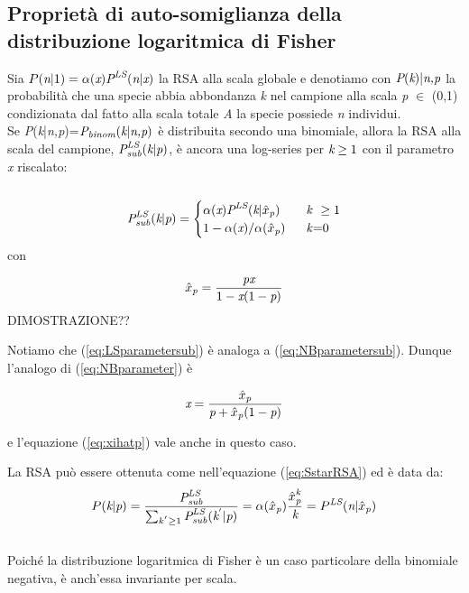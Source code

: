 \subsection{Proprietà di auto-somiglianza della distribuzione logaritmica di Fisher}
Sia $P(\emph{n}|1)=\alpha(\emph{x})\emph{P}^{\emph{LS}}(\emph{n}|\emph{x})$ la RSA alla scala globale e denotiamo con $\emph{P}(\emph{k})|\emph{n,p}$ la probabilità che una specie abbia abbondanza \emph{k} nel campione alla scala \emph{p} $\in$ (0,1) condizionata dal fatto  alla scala totale \emph{A} la specie possiede \emph{n} individui.\\
Se \emph{P}(\emph{k}|\emph{n,p})=$\emph{P}_\emph{binom}(\emph{k}|\emph{n,p})$ è distribuita secondo una binomiale, allora la RSA alla scala del campione, $\emph{P}^\emph{LS}_\emph{sub}(\emph{k}|\emph{p})$, è ancora una log-series per $\emph{k}\ge 1$ con il parametro \emph{x} riscalato:
\\ \\
\begin{equation}
\emph{P}^\emph{LS}_\emph{sub}(\emph{k}|\emph{p})=\begin{cases} \alpha(\emph{x}) \emph{P}^\emph{LS}(\emph{k}|\emph{$ \hat x$}_\emph{p}) & \mbox{ }\mbox{ \emph{k} } \ge 1 \\ 1-\alpha(\emph{x})/\alpha(\emph{$\hat x$}_\emph{p}) & \mbox{ } \mbox{ \emph{k}=0}
\end{cases}
\end{equation}
con



\begin{equation}
\emph{$\hat x$}_\emph{p}=\frac{\emph{px}}{1-\emph{x}(1-\emph{p})}
\label{eq:LSparametersub}
\end{equation}
DIMOSTRAZIONE??

Notiamo che (\ref{eq:LSparametersub}) è analoga a (\ref{eq:NBparametersub}). Dunque l'analogo di (\ref{eq:NBparameter}) è


\begin{equation}
\emph{x}=\frac{\emph{$\hat x$}_\emph{p}}{\emph{p}+\emph{$\hat x$}_\emph{p}(1-\emph{p})}
\label{eq:LSparameter}
\end{equation}

e l'equazione (\ref{eq:xihatp}) vale anche in questo caso.


La RSA può essere ottenuta come nell'equazione (\ref{eq:SstarRSA}) ed è data da:
\\
\begin{equation}
P(\emph{k}|\emph{p})=\frac{\emph{P}^\emph{LS}_\emph{sub}}{\sum_{k^{'} \ge 1}^{} \emph{P}^\emph{LS}_\emph{sub}(\emph{k}^{'}|\emph{p})}=\alpha(\emph{$\hat x$}_\emph{p}) \frac{\emph{$\hat x$}^\emph{k}_\emph{p}}{\emph{k}}=P^\emph{LS}(\emph{n}| \emph{$\hat x$}_\emph{p})
\end{equation}
\\ 
Poiché la distribuzione logaritmica di Fisher è un caso particolare della binomiale negativa, è anch'essa invariante per scala.


